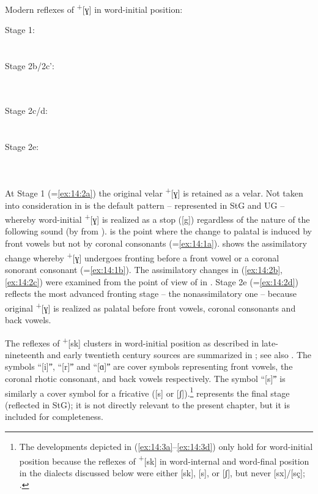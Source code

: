 \ea%
\label{ex:14:2}Modern reflexes of  \textsuperscript{+}[ɣ] in word-initial position:
\begin{multicols}{4}\raggedcolumns
\ea    Stage 1:\\\label{ex:14:2a}
  \relax  [ɣi   ɣl   ɣɑ]\\     
  \relax  [xi   xl   xɑ]\\  
\ex  Stage 2b/2c':\\\label{ex:14:2b}
 \relax  [ʝi   ɣl   ɣɑ]\\
 \relax  [çi  xl   xɑ]\\
 \relax  [ʝi  çl   ʝɑ]    
   
\ex Stage 2c/d:\\\label{ex:14:2c}
 \relax [ʝi    ʝl   ɣɑ]\\ 
 \relax [çi   çl   xɑ]\\

\ex Stage 2e:\\\label{ex:14:2d}
 \relax [ʝi   ʝl   ʝɑ]\\
 \relax [çi  çl  çɑ]\\
\z 
\end{multicols}
\z 

At Stage 1 (=\ref{ex:14:2a}) the original velar \textsuperscript{+}[ɣ] is retained as a velar. Not taken into consideration in  is the default pattern -- represented in StG and UG -- whereby word-initial \textsuperscript{+}[ɣ] is realized as a stop ([g]) regardless of the nature of the following sound (by  from ).  is the point where the change to palatal is induced by front vowels but not by coronal consonants (=\ref{ex:14:1a}).  shows the assimilatory change whereby \textsuperscript{+}[ɣ]  undergoes fronting before a front vowel or a coronal sonorant consonant (=\ref{ex:14:1b}). The assimilatory changes in (\ref{ex:14:2b}, \ref{ex:14:2c}) were examined from the point of view of  in . Stage 2e (=\ref{ex:14:2d}) reflects the most advanced fronting stage -- the nonassimilatory one -- because original \textsuperscript{+}[ɣ] is realized as palatal before front vowels, coronal consonants and back vowels.

The reflexes of  \textsuperscript{+}[sk] clusters in word-initial position as described in late-nineteenth and early twentieth century sources are summarized in ; see also \citet{Hall2021}. The symbols “[i]ˮ, “[r]ˮ and “[ɑ]ˮ are cover symbols representing front vowels, the coronal rhotic consonant, and back vowels respectively. The symbol “[s]ˮ is similarly a cover symbol for a  fricative ([s] or [ʃ]).\footnote{{The developments depicted in (\ref{ex:14:3a}--\ref{ex:14:3d}) only hold for word-initial position because the reflexes of } \textrm{\textsuperscript{+}}\textrm{[sk] in word-internal and word-final position in the dialects discussed below were either [sk], [s], or [ʃ], but never [sx]/[sç]; \citet{Hall2021}.}}  represents the final stage (reflected in StG); it is not directly relevant to the present chapter, but it is included for completeness.

